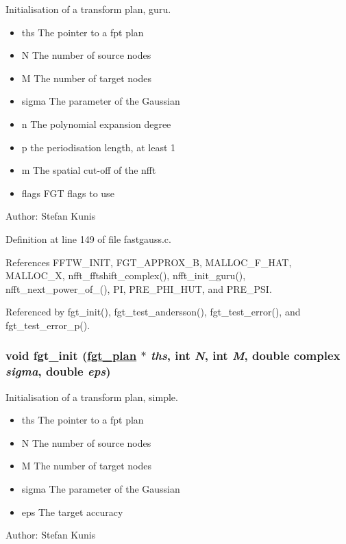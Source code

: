 Initialisation of a transform plan, guru. 

\begin{itemize}
\item ths The pointer to a fpt plan \item N The number of source nodes \item M The number of target nodes \item sigma The parameter of the Gaussian \item n The polynomial expansion degree \item p the periodisation length, at least 1 \item m The spatial cut-off of the nfft \item flags FGT flags to use\end{itemize}
\begin{Desc}
\item[Author:]Stefan Kunis \end{Desc}


Definition at line 149 of file fastgauss.c.

References FFTW\_\-INIT, FGT\_\-APPROX\_\-B, MALLOC\_\-F\_\-HAT, MALLOC\_\-X, nfft\_\-fftshift\_\-complex(), nfft\_\-init\_\-guru(), nfft\_\-next\_\-power\_\-of\_(), PI, PRE\_\-PHI\_\-HUT, and PRE\_\-PSI.

Referenced by fgt\_\-init(), fgt\_\-test\_\-andersson(), fgt\_\-test\_\-error(), and fgt\_\-test\_\-error\_\-p().\hypertarget{group__applications__fastgauss_ga3}{
\subsubsection[fgt\_\-init]{\setlength{\rightskip}{0pt plus 5cm}void fgt\_\-init (\hyperlink{structfgt__plan}{fgt\_\-plan} $\ast$ {\em ths}, int {\em N}, int {\em M}, double complex {\em sigma}, double {\em eps})}}
\label{group__applications__fastgauss_ga3}


Initialisation of a transform plan, simple. 

\begin{itemize}
\item ths The pointer to a fpt plan \item N The number of source nodes \item M The number of target nodes \item sigma The parameter of the Gaussian \item eps The target accuracy\end{itemize}
\begin{Desc}
\item[Author:]Stefan Kunis \end{Desc}


